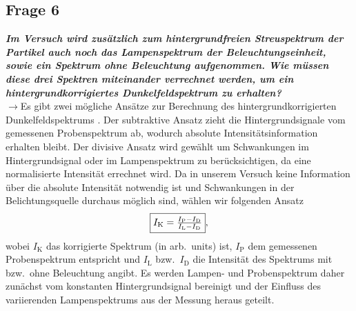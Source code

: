\subsection{\label{subsec:FZV6}Frage 6}
\textbf{\textit{Im Versuch wird zusätzlich zum hintergrundfreien Streuspektrum der Partikel auch
noch das Lampenspektrum der Beleuchtungseinheit, sowie ein Spektrum ohne Beleuchtung
aufgenommen. Wie müssen diese drei Spektren miteinander verrechnet
werden, um ein hintergrundkorrigiertes Dunkelfeldspektrum zu erhalten?}} \\
$\rightarrow$Es gibt zwei mögliche Ansätze zur Berechnung des hintergrundkorrigierten Dunkelfeldspektrums \cite{FZV5}.
Der subtraktive Ansatz zieht die Hintergrundsignale vom gemessenen Probenspektrum ab, wodurch 
absolute Intensitätsinformation erhalten bleibt. Der divisive Ansatz wird gewählt um 
Schwankungen im Hintergrundsignal oder im Lampenspektrum zu berücksichtigen, da eine normalisierte 
Intensität errechnet wird.
Da in unserem Versuch keine Information über die absolute Intensität notwendig ist und 
Schwankungen in der Belichtungsquelle durchaus möglich sind, wählen wir folgenden Ansatz
\begin{equation}
    \fbox{$I_{\text{K}} = \frac{I_{\text{P}}-I_{\text{D}}}{I_{\text{L}}-I_{\text{D}}}$},
\end{equation}
wobei $I_{\text{K}}$ das korrigierte Spektrum (in arb.~units) ist, $I_{\text{P}}$ dem gemessenen Probenspektrum entspricht 
und $I_{\text{L}}$ bzw.~$I_{\text{D}}$ die Intensität des Spektrums mit bzw.~ohne Beleuchtung angibt.
Es werden Lampen- und Probenspektrum daher zunächst vom konstanten Hintergrundsignal bereinigt und der 
Einfluss des variierenden Lampenspektrums aus der Messung heraus geteilt.  
